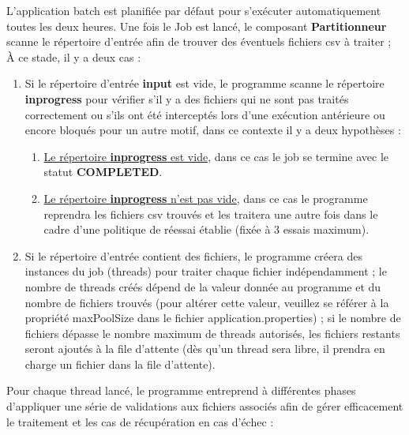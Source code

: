 \clearpage
{}
L'application batch est planifiée par défaut pour s'exécuter automatiquement toutes les deux heures. Une fois le Job est lancé, le composant \textbf{Partitionneur} scanne le répertoire d'entrée afin de trouver des éventuels fichiers csv à traiter ;\\
À ce stade, il y a deux cas :

\begin{enumerate}
    \item Si le répertoire d'entrée \textbf{input} est vide, le programme scanne le répertoire \textbf{inprogress} pour vérifier s'il y a des fichiers qui ne sont pas traités correctement ou s'ils ont été interceptés lors d'une exécution antérieure ou encore bloqués pour un autre motif, dans ce contexte il y a deux hypothèses :
    \begin{enumerate}
        \item \underline{Le répertoire \textbf{inprogress} est vide}, dans ce cas le job se termine avec le statut \textbf{COMPLETED}.
        \item \underline{Le répertoire \textbf{inprogress} n'est pas vide}, dans ce cas le programme reprendra les fichiers csv trouvés et les traitera une autre fois dans le cadre d'une politique de réessai établie (fixée à 3 essais maximum).
    \end{enumerate}
    \item Si le répertoire d'entrée contient des fichiers, le programme créera des instances du job (threads) pour traiter chaque fichier indépendamment ; le nombre de threads créés dépend de la valeur donnée au programme et du nombre de fichiers trouvés (pour altérer cette valeur, veuillez se référer à la propriété maxPoolSize dans le fichier application.properties) ; si le nombre de fichiers dépasse le nombre maximum de threads autorisés, les fichiers restants seront ajoutés à la file d'attente (dès qu'un thread sera libre, il prendra en charge un fichier dans la file d'attente).\\
\end{enumerate}
Pour chaque thread lancé, le programme entreprend à différentes phases d'appliquer une série de validations aux fichiers associés afin de gérer efficacement le traitement et les cas de récupération en cas d'échec :
